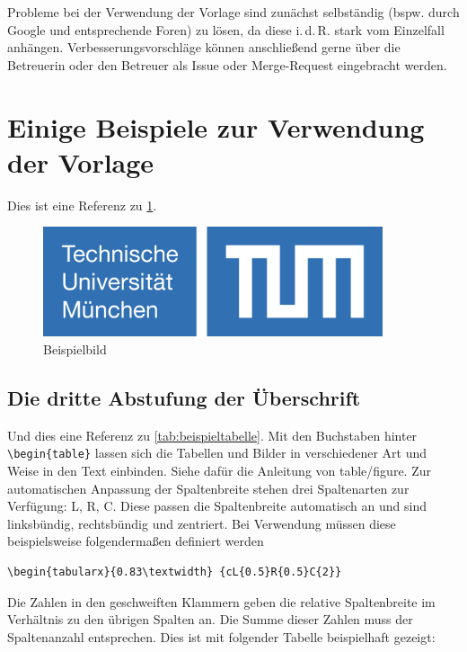 Probleme bei der Verwendung der Vorlage sind zunächst selbständig (bspw. durch Google und entsprechende Foren) zu lösen, da diese i.\,d.\,R. stark vom Einzelfall anhängen. Verbesserungsvorschläge können anschließend gerne über die Betreuerin oder den Betreuer als Issue oder Merge-Request eingebracht werden.

\section{Einige Beispiele zur Verwendung der Vorlage}
\label{sec:verwendung_vorlage}

Dies ist eine Referenz zu \cref{fig:beispielbild}.

\begin{figure}[htbp] 
	\centering
	\includegraphics[width=10cm]{./figures/logotum_neu.png}
	\caption{Beispielbild}
	\label{fig:beispielbild}
\end{figure}

\subsection{Die dritte Abstufung der Überschrift}

Und dies eine Referenz zu \cref{tab:beispieltabelle}. Mit den Buchstaben hinter \verb|\begin{table}| lassen sich die Tabellen und Bilder in verschiedener Art und Weise in den Text einbinden. Siehe dafür die Anleitung von table/figure. Zur automatischen Anpassung der Spaltenbreite stehen drei Spaltenarten zur Verfügung: L, R, C. Diese passen die Spaltenbreite automatisch an und sind linksbündig, rechtsbündig und zentriert. Bei Verwendung müssen diese beispielsweise folgendermaßen definiert werden \begin{verbatim}\begin{tabularx}{0.83\textwidth} {cL{0.5}R{0.5}C{2}}\end{verbatim} 
Die Zahlen in den geschweiften Klammern geben die relative Spaltenbreite im Verhältnis zu den übrigen Spalten an. Die Summe dieser Zahlen muss der Spaltenanzahl entsprechen. Dies ist mit folgender Tabelle beispielhaft gezeigt: \\


